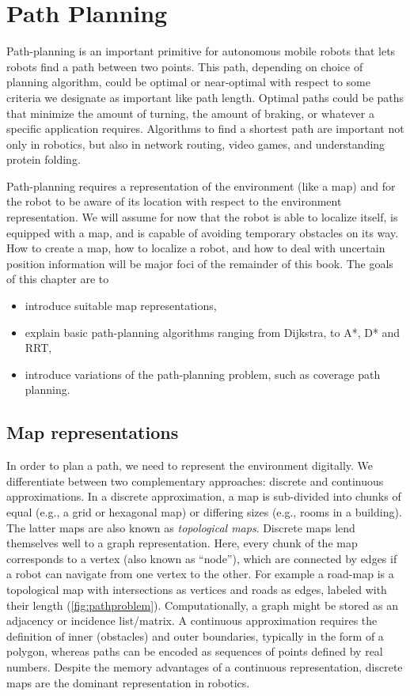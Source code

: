 \chapter{Path Planning}\label{chap:pathplanning}
Path-planning is an important primitive for autonomous mobile robots that lets robots find a path between two points. This path, depending on choice of planning algorithm, could be optimal or near-optimal with respect to some criteria we designate as important like path length. Optimal paths could be paths that minimize the amount of turning, the amount of braking, or whatever a specific application requires. Algorithms to find a shortest path are important not only in robotics, but also in network routing, video games, and understanding protein folding.

Path-planning requires a representation of the environment (like a map) and for the robot to be aware of its location with respect to the environment representation. We will assume for now that the robot is able to localize itself, is equipped with a map, and is capable of avoiding temporary obstacles on its way. How to create a map, how to localize a robot, and how to deal with uncertain position information will be major foci of the remainder of this book. The goals of this chapter are to

\begin{itemize}
\item introduce suitable map representations,
\item explain basic path-planning algorithms  ranging from Dijkstra, to A*, D* and RRT,
\item introduce variations of the path-planning problem, such as coverage path planning.
\end{itemize}

\section{Map representations}\label{sec:maps}
In order to plan a path, we need to represent the environment digitally. We differentiate between two complementary approaches: discrete and continuous approximations. In a discrete approximation, a map is sub-divided into chunks of equal (e.g., a grid or hexagonal map) or differing sizes (e.g., rooms in a building). The latter maps are also known as \textsl{topological maps}. Discrete maps lend themselves well to a graph representation. Here, every chunk of the map corresponds to a vertex (also known as ``node''), which are connected by edges if a robot can navigate from one vertex to the other. For example a road-map is a topological map with intersections as vertices and roads as edges, labeled with their length (\cref{fig:pathproblem}). Computationally, a graph might be stored as an adjacency or incidence list/matrix. A continuous approximation requires the definition of inner (obstacles) and outer boundaries, typically in the form of a polygon, whereas paths can be encoded as sequences of points defined by real numbers. Despite the memory advantages of a continuous representation, discrete maps are the dominant representation in robotics.

